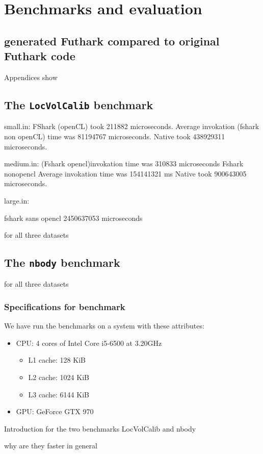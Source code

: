 \chapter{Benchmarks and evaluation}
\section{\fshark{} generated Futhark compared to original Futhark code}

Appendices show 
\section{The \texttt{LocVolCalib} benchmark}
small.in:
FShark (openCL) took 211882 microseconds.
Average invokation (fshark non openCL) time was 81194767 microseconds.
Native took 438929311 microseconds.

medium.in:
(Fshark opencl)invokation time was 310833 microseconds
Fshark nonopencl Average invokation time was 154141321 ms
Native took 900643005 microseconds.

large.in:

fshark sans opencl 2450637053 microseconds


for all three datasets


\section{The \texttt{nbody} benchmark}

for all three datasets


\subsection{Specifications for benchmark}
We have run the benchmarks on a system with these attributes:
\begin{itemize}
\item CPU: 4 cores of Intel Core i5-6500 at 3.20GHz
  \begin{itemize}
  \item L1 cache: 128 KiB 
  \item L2 cache: 1024 KiB 
  \item L3 cache: 6144 KiB 
  \end{itemize}
\item GPU: GeForce GTX 970
\end{itemize}


Introduction for the two benchmarks LocVolCalib and nbody



why are they faster in general



